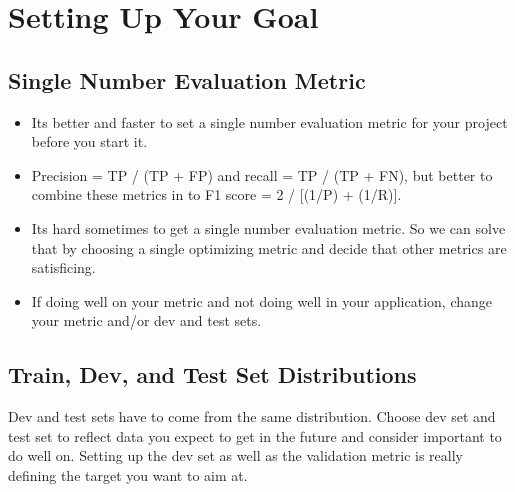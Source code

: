 \section{Setting Up Your Goal}

\subsection{Single Number Evaluation Metric}

\begin{itemize}[wide, labelwidth=!, labelindent=0pt]
\itemsep0em 
    \item Its better and faster to set a single number evaluation metric for your project before you start it. 
    \item Precision = TP / (TP + FP) and recall = TP / (TP + FN), but better to combine these metrics in to F1 score = 2 / [(1/P) + (1/R)].
    \item Its hard sometimes to get a single number evaluation metric. So we can solve that by choosing a single optimizing metric and decide that other metrics are satisficing.
    \item If doing well on your metric and not doing well in your application, change your metric and/or dev and test sets. \vspace*{-\baselineskip}
\end{itemize}

\subsection{Train, Dev, and Test Set Distributions}

Dev and test sets have to come from the same distribution. Choose dev set and test set to reflect data you expect to get in the future and consider important to do well on. Setting up the dev set as well as the validation metric is really defining the target you want to aim at.





